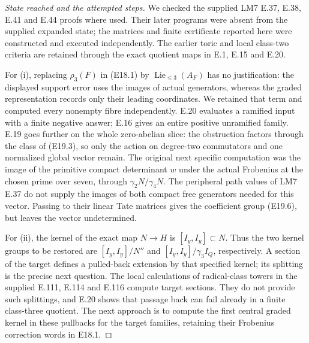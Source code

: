 \begin{proof}[State reached and the attempted steps]
We checked the supplied LM7 E.37, E.38, E.41
and E.44 proofs where used. Their later programs
were absent from the supplied expanded state;
the matrices and finite certificate reported
here were constructed and executed independently.
The earlier toric and local class-two criteria
are retained through the exact quotient maps
in E.1, E.15 and E.20.

For (i), replacing $\rho_3(F)$ in (E18.1)
by $\operatorname{Lie}_{\le3}(A_F)$ has no
justification: the displayed support error
uses the images of actual generators, whereas
the graded representation records only their
leading coordinates. We retained that term
and computed every nonempty fibre independently.
E.20 evaluates a ramified input with a finite
negative answer; E.16 gives an entire positive
unramified family. E.19 goes further on the
whole zero-abelian slice: the obstruction
factors through the class of (E19.3), so only
the action on degree-two commutators and one
normalized global vector remain. The original next
specific computation was the image of the
primitive compact determinant $w$ under the
actual Frobenius at the chosen prime over
seven, through $\gamma_2N/\gamma_4N$.
The peripheral path values of LM7 E.37
do not supply the images of both compact
free generators needed for this vector.
Passing to their linear Tate matrices gives
the coefficient group (E19.6), but leaves
the vector undetermined.

For (ii), the kernel of the exact map
$N\to H$ is $[I_y,I_y]\subset N$.
Thus the two kernel groups to be restored are
$[I_y,I_y]/N''$ and
$[I_y,I_y]/\gamma_3I_Q$, respectively.
A section of the target defines a pulled-back
extension by that specified kernel; its
splitting is the precise next question.
The local calculations of radical-class
towers in the supplied E.111, E.114 and
E.116 compute target sections. They do
not provide such splittings, and E.20
shows that passage back can fail already
in a finite class-three quotient.
The next approach is to compute the first
central graded kernel in these pullbacks
for the target families, retaining their
Frobenius correction words in E18.1.


\end{proof}
